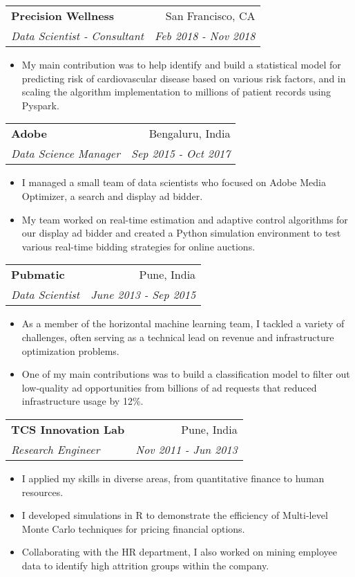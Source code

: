 \documentclass[letterpaper,11pt]{article}
\makeatletter
\newcommand{\resumeSubheading}[4]{
  \vspace{-1pt}\item
    \begin{tabular*}{0.97\textwidth}[t]{l@{\extracolsep{\fill}}r}
      \textbf{#1} & #2 \\
      \textit{\small#3} & \textit{\small #4} \\
    \end{tabular*}\vspace{-5pt}
}
\makeatother
\begin{document}
 \resumeSubheading
      {Precision Wellness}{San Francisco, CA}
      {Data Scientist - Consultant}{Feb 2018 - Nov 2018}
\begin{itemize}
\item My main contribution was to help identify and build a statistical model for
        predicting risk of cardiovascular disease based on various risk factors, and in scaling the algorithm implementation to millions of patient records using Pyspark.
\end{itemize}
\resumeSubheading
	{Adobe}{Bengaluru, India}
	{Data Science Manager}{Sep 2015 - Oct 2017}
\begin{itemize}
	\item I managed a small team of data scientists who focused on Adobe Media Optimizer, a search and display ad bidder. 
    \item My team worked on real-time estimation and adaptive control algorithms for our display ad bidder 
    and created a Python simulation environment to test various real-time bidding strategies for online auctions. 
\end{itemize}

\resumeSubheading
	{Pubmatic}{Pune, India}
	{Data Scientist}{June 2013 - Sep 2015}
\begin{itemize}
	\item As a member of the horizontal machine learning team, I tackled a variety of challenges, 
    often serving as a technical lead on revenue and infrastructure optimization problems. 
    \item One of my main contributions was to build a classification model to filter out low-quality ad opportunities from billions of ad requests
    that reduced infrastructure usage by 12\%.
\end{itemize}

\resumeSubheading
	{TCS Innovation Lab}{Pune, India}
	{Research Engineer}{Nov 2011 - Jun 2013}
\begin{itemize}
	\item I applied my skills in diverse areas, from quantitative finance to human resources. 
    \item I developed simulations in R to demonstrate the efficiency of Multi-level Monte Carlo techniques for pricing financial options. 
    \item Collaborating with the HR department, I also worked on mining employee data to identify high attrition groups within the company.   
\end{itemize}
\end{document}
